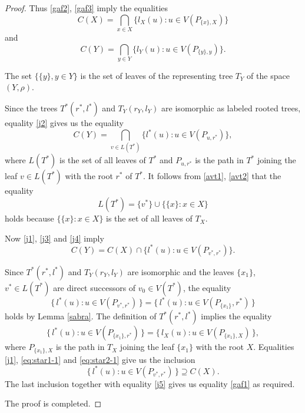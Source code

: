 \documentclass[pdflatex,sn-mathphys-num]{sn-jnl}%
\theoremstyle{thmstyleone}%
\theoremstyle{thmstyletwo}%
\theoremstyle{thmstylethree}%
\theoremstyle{thmstyletwo}%
\theoremstyle{thmstylethree}%
\begin{document}
\begin{proof}
Thus \eqref{gaf2}, \eqref{gaf3} imply the equalities
\begin{equation}\label{j1}
C(X)=\bigcap_{x\in X}\{l_X(u):u\in V(P_{\{x\},X})\}
\end{equation}
and
\begin{equation}\label{j2}
C(Y)=\bigcap_{y\in Y}\{l_Y(u):u\in V(P_{\{y\},y})\}.
\end{equation}

The set $\{\{y\}, y\in Y\}$ is the set of leaves of the representing tree $T_Y$ of the space $(Y,\rho)$. 


Since the trees $T^*(r^*,l^*)$ and $T_Y(r_Y,l_Y)$ are isomorphic as labeled rooted trees,
equality \eqref{j2} gives us the equality
\begin{equation}\label{j3}
C(Y)=\bigcap_{v\in L(T^*)}\{l^{*}(u):u\in V(P_{u,r^*})\},
\end{equation}
where $L(T^*)$ is the set of all leaves of $T^*$ and
$P_{u,r^*}$ is the path in $T^*$ joining the leaf $v\in L(T^*)$
with the root $r^*$ of $T^*$.
It follows from \eqref{avt1}, \eqref{avt2} that  the equality
\begin{equation}\label{j4}
L(T^*)=\{v^*\}\cup\{\{x\}:x\in X\}
\end{equation}
holds because $\{\{x\}:x\in X\}$ is the set of all leaves of $T_X$.

Now \eqref{j1}, \eqref{j3} and \eqref{j4} imply
\begin{equation}\label{j5}
C(Y)=C(X)\cap\{l^{*}(u):u\in V(P_{v^*,r^*})\}.
\end{equation}










Since $T^*(r^*,l^*)$ and $T_Y(r_Y,l_Y)$ are isomorphic and the leaves $\{x_1\}$, $v^* \in L(T^*)$ are direct successors of $v_0 \in V(T^*)$,
the equality
\begin{equation}
\{\, l^*(u) : u \in V(P_{v^*,r^*}) \,\}
=
\{\, l^*(u) : u \in V(P_{\{x_1\}},r^*) \,\}
\label{eq:star1-1}
\end{equation}
 holds by Lemma \ref{sabra}.
The definition of $T^*(r^*,l^*)$ implies the equality
\begin{equation}
\{\, l^*(u) : u \in V(P_{\{x_1\},r^*}) \,\}
=
\{\, l_X(u) : u \in V(P_{\{x_1\},X}) \,\},
\label{eq:star2-1}
\end{equation}
where $P_{\{x_1\},X}$ is the path in $T_X$ joining the leaf $\{x_1\}$ with the root $X$.
Equalities \eqref{j1}, \eqref{eq:star1-1} and \eqref{eq:star2-1} give us the inclusion
\begin{equation}
\{\, l^*(u) : u \in V(P_{v^*,r^*}) \,\} \supseteq C(X).
\label{eq:inclusion}
\end{equation}
The last inclusion together with equality \eqref{j5} gives us equality \eqref{gaf1} as required.

The proof is completed.
\end{proof}
\end{document}
